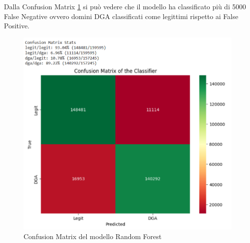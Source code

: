 \documentclass[12pt,a4paper,openright,twoside]{book}
\begin{document}
\noindent Dalla Confusion Matrix \ref{fig:RF confusion matrix} si può vedere che il modello ha classificato
più di 5000 False Negative ovvero domini DGA classificati come legittimi rispetto ai False Positive.

\begin{figure}[H]
    \centering
    \includegraphics[width=.8\linewidth]{figures/RF_conf_matr.png}
    \caption{Confusion Matrix del modello Random Forest}
    \label{fig:RF confusion matrix}
\end{figure}
\end{document}
